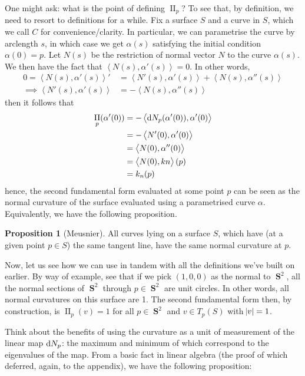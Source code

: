 \documentclass{amsart} %
\theoremstyle{mytheoremstyle}
\theoremstyle{definition}
\newtheorem{proposition}[definition]{Proposition}
\numberwithin{equation}{section}
\DeclareMathOperator{\II}{II}
\DeclareMathOperator{\1}{\mathbbm{1}}
\DeclareMathOperator{\D}{\dif}
\DeclareMathOperator{\sphere}{\mathbf{S}}
\newcommand{\innerproduct}[2]{\left\langle #1,#2 \right\rangle}
\begin{document}
One might ask: what is the point of defining $\II_p$? To see that, by definition, we need to resort to definitions for a while. Fix a surface $S$ and a curve in $S$, which we call $C$ for convenience/clarity. In particular, we can parametrise the curve by arclength $s$, in which case we get $\alpha(s)$ satisfying the initial condition $\alpha(0) = p$. Let $N(s)$ be the restriction of normal vector $N$ to the curve $\alpha(s)$. We then have the fact that $\innerproduct{N(s)}{\alpha'(s)} = 0$. In other words,
\begin{align*}
0 = \innerproduct{N(s)}{\alpha'(s)}' &= \innerproduct{N'(s)}{\alpha'(s)} + \innerproduct{N(s)}{\alpha''(s)} \\
\implies \innerproduct{N'(s)}{\alpha'(s)} &= - \innerproduct{N(s)}{\alpha''(s)} 
\end{align*}
then it follows that
\begin{align*}
	\II_p (\alpha'(0)) &= - \innerproduct{\D N_p (\alpha'(0))}{\alpha'(0)} \\
	&= - \innerproduct{N'(0)}{\alpha'(0)} \\
	&= \innerproduct{N(0)}{\alpha''(0)} \\
	&= \innerproduct{N(0)}{kn} (p) \\
	&= k_n (p)
\end{align*}
hence, the second fundamental form evaluated at some point $p$ can be seen as the normal curvature of the surface evaluated using a parametrised curve $\alpha$. Equivalently, we have the following proposition.

\begin{proposition}[Meusnier]
	\label{propmeusnier}
	All curves lying on a surface $S$, which have (at a given point $p \in S$) the same tangent line, have the same normal curvature at $p$.
\end{proposition}

Now, let us see how we can use  in tandem with all the definitions we've built on earlier. By way of example, see that if we pick $(1,0,0)$ as the normal to $\sphere^2$, all the normal sections of $\sphere^2$ through $p \in \sphere^2$ are unit circles. In other words, all normal curvatures on this surface are 1. The second fundamental form then, by construction, is $\II_p (v) = 1$ for all $p \in \sphere^2$ and $v \in T_p (S)$ with $\abs{v} = 1$.

Think about the benefits of using the curvature as a unit of measurement of the linear map $\D N_p$: the maximum and minimum of which correspond to the eigenvalues of the map. From a basic fact in linear algebra (the proof of which deferred, again, to the appendix), we have the following proposition:
\end{document}
